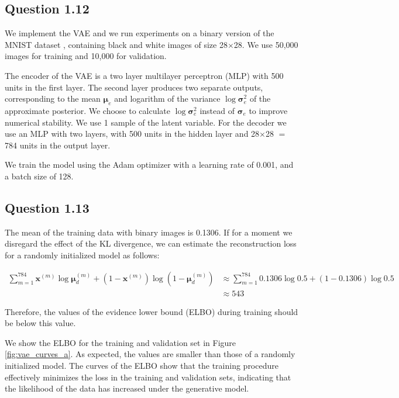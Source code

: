 \documentclass{article}
\begin{document}
\subsection*{Question 1.12}

We implement the VAE and we run experiments on a binary version of the MNIST dataset \cite{lecun1998gradient}, containing black and white images of size 28$\times$28. We use 50,000 images for training and 10,000 for validation.

The encoder of the VAE is a two layer multilayer perceptron (MLP) with 500 units in the first layer. The second layer produces two separate outputs, corresponding to the mean $\boldsymbol{\mu}_e$ and logarithm of the variance $\log\boldsymbol{\sigma}_e^2$ of the approximate posterior. We choose to calculate $\log\boldsymbol{\sigma}_e^2$ instead of $\boldsymbol{\sigma}_e$ to improve numerical stability. We use 1 sample of the latent variable. For the decoder we use an MLP with two layers, with 500 units in the hidden layer and 28$\times$28 $=$ 784 units in the output layer.

We train the model using the Adam optimizer \cite{kingma2014adam} with a learning rate of 0.001, and a batch size of 128.

\subsection*{Question 1.13}

The mean of the training data with binary images is 0.1306. If for a moment we disregard the effect of the KL divergence, we can estimate the reconstruction loss for a randomly initialized model as follows:

\begin{align*}
\sum_{m=1}^{784} \mathbf{x}^{(m)}\log\boldsymbol{\mu}_d^{(m)} + (1-\mathbf{x}^{(m)})\log(1 -\boldsymbol{\mu}_d^{(m)})
&\approx
\sum_{m=1}^{784} 0.1306\log 0.5 + (1-0.1306)\log 0.5 \\
&\approx 543
\end{align*}

Therefore, the values of the evidence lower bound (ELBO) during training should be below this value.

We show the ELBO for the training and validation set in Figure \ref{fig:vae_curves_a}. As expected, the values are smaller than those of a randomly initialized model. The curves of the ELBO show that the training procedure effectively minimizes the loss in the training and validation sets, indicating that the likelihood of the data has increased under the generative model.
\end{document}
